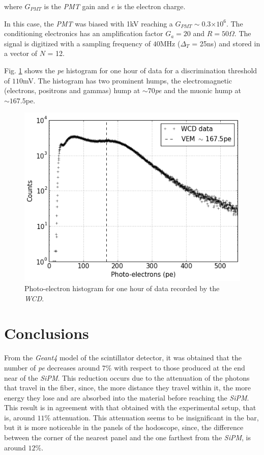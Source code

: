 \documentclass[submitting]{nst}
\begin{document}
where $G_{PMT}$ is the \textsl{PMT} gain and $e$ is the electron charge.

In this case, the \textsl{PMT} was biased with 1kV reaching a $G_{PMT}\sim$0.3$\times10^6$. The conditioning electronics has an amplification factor $G_a = 20$ and $R = 50 \Omega$. The signal is digitized with a sampling frequency of $40$MHz ($\Delta_T$ = 25ns) and stored in a vector of $N$ = 12.  

Fig. \ref{WCDpe} shows the \textsl{pe} histogram for one hour of data for a discrimination threshold of $110$mV. The histogram has two prominent humps, the electromagnetic (electrons, positrons and gammas) hump at $\sim 70$\textsl{pe} and the muonic hump at $\sim 167.5$pe.


\begin{figure}
    \centering
    \includegraphics[scale=0.45]{Figures/WCDpedata.png}
    \caption{Photo-electron histogram for one hour of data recorded by the \textsl{WCD}. }
    \label{WCDpe}
\end{figure}



\section{Conclusions}\label{sec:conclusions}%

From the \textsl{Geant4} model of the scintillator detector, it was obtained that the number of \textsl{pe} decreases around $7$\% with respect to those produced at the end near of the \textsl{SiPM}. This reduction occurs due to the attenuation of the photons that travel in the fiber, since, the more distance they travel within it, the more energy they lose and are absorbed into the material before reaching the \textsl{SiPM}. This result is in agreement with that obtained with the experimental setup, that is, around $11$\% attenuation. This attenuation seems to be insignificant in the bar, but it is more noticeable in the panels of the hodoscope, since, the difference between the corner of the nearest panel and the one farthest from the \textsl{SiPM}, is around $12$\%.
\end{document}
